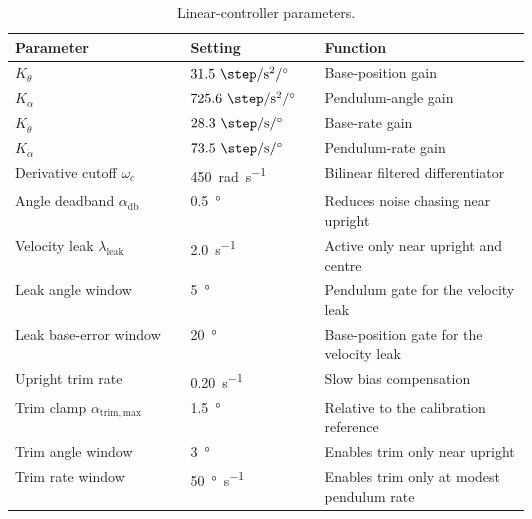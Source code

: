\begin{table}[htbp]
  \centering
  \footnotesize
  \renewcommand{\arraystretch}{1.05}
  \caption{Linear-controller parameters.}
  \begin{tabularx}{\linewidth}{@{}p{0.34\linewidth}p{0.26\linewidth}X@{}}
    \toprule
    Parameter & Setting & Function \\
    \midrule
    $K_{\theta}$ & $31.5\ \si{\step\per\second\squared\per\degree}$ & Base-position gain \\
    $K_{\alpha}$ & $725.6\ \si{\step\per\second\squared\per\degree}$ & Pendulum-angle gain \\
    $K_{\dot{\theta}}$ & $28.3\ \si{\step\per\second\per\degree}$ & Base-rate gain \\
    $K_{\dot{\alpha}}$ & $73.5\ \si{\step\per\second\per\degree}$ & Pendulum-rate gain \\
    Derivative cutoff $\omega_c$ & \SI{450}{rad\per\second} & Bilinear filtered differentiator \\
    Angle deadband $\alpha_{\mathrm{db}}$ & \SI{0.5}{\degree} & Reduces noise chasing near upright \\
    Velocity leak $\lambda_{\mathrm{leak}}$ & \SI{2.0}{s^{-1}} & Active only near upright and centre \\
    Leak angle window & \SI{5}{\degree} & Pendulum gate for the velocity leak \\
    Leak base-error window & \SI{20}{\degree} & Base-position gate for the velocity leak \\
    Upright trim rate & \SI{0.20}{s^{-1}} & Slow bias compensation \\
    Trim clamp $\alpha_{\mathrm{trim,max}}$ & \SI{1.5}{\degree} & Relative to the calibration reference \\
    Trim angle window & \SI{3}{\degree} & Enables trim only near upright \\
    Trim rate window & \SI{50}{\degree\per\second} & Enables trim only at modest pendulum rate \\
    \bottomrule
  \end{tabularx}
\end{table}


